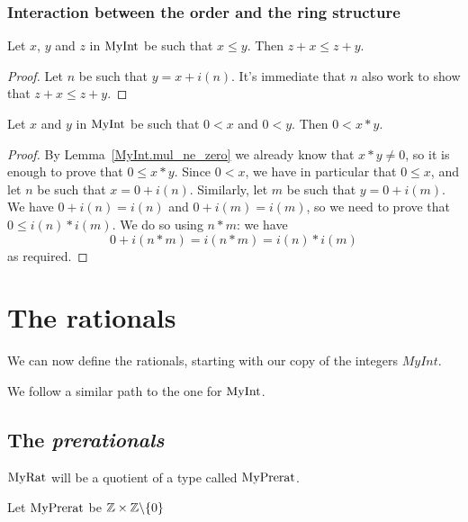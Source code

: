 \subsection{Interaction between the order and the ring structure}

\begin{lemma}
    \label{MyInt.add_le_add_left}
    \leanok
    Let $x$, $y$ and $z$ in $\mathrm{MyInt}$ be such that $x \leq y$. Then $z + x ≤ z + y$.
\end{lemma}
\begin{proof}
    \leanok
    Let $n$ be such that $y = x + i(n)$. It's immediate that $n$ also work to show that $z + x ≤ z + y$.
\end{proof}

\begin{lemma}
    \label{MyInt.mul_pos}
    \leanok
    Let $x$ and $y$ in $\mathrm{MyInt}$ be such that $0 < x$ and $0 < y$. Then $0 < x * y$.
\end{lemma}
\begin{proof}
    \leanok
    By Lemma~\ref{MyInt.mul_ne_zero} we already know that $x*y \neq 0$, so it is enough to prove that
    $0 \leq x*y$. Since $0 < x$, we have in particular that $0 \leq x$, and let $n$ be such that $x = 0 + i(n)$. Similarly, let $m$ be such that $y = 0 + i(m)$. We have $0 + i(n) = i(n)$ and $0 + i(m) = i(m)$, so we need to prove that $0 \leq i(n)*i(m)$. We do so using $n*m$: we have
    \[
    0+i(n*m)=i(n*m)=i(n)*i(m)
    \]
    as required.
\end{proof}

\chapter{The rationals}

We can now define the rationals, starting with our copy of the integers $MyInt$.

We follow a similar path to the one for $\mathrm{MyInt}$.

\section{The \emph{prerationals}}

$\mathrm{MyRat}$ will be a quotient of a type called $\mathrm{MyPrerat}$.

\begin{definition}
    \label{MyPrerat}
    \leanok
    Let $\mathrm{MyPrerat}$ be $\mathbb{Z} \times \mathbb{Z} \backslash \{0\}$
\end{definition}

